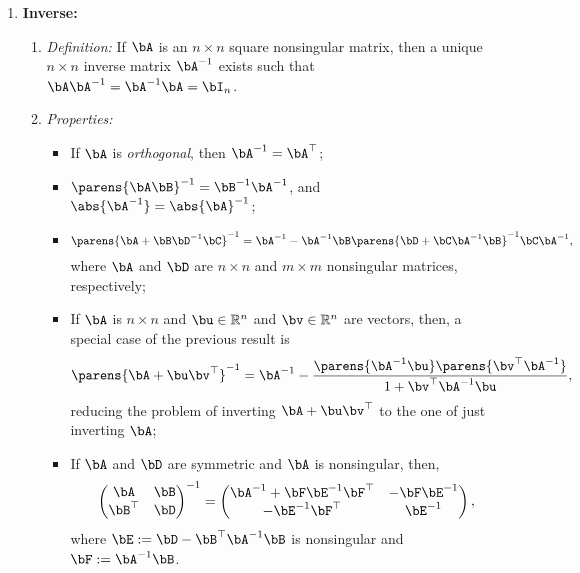 \documentclass[12pt]{article}
\begin{document}
\begin{enumerate}[label=\textbf{\arabic*.}]
	\item \textbf{Inverse:} 
	\begin{enumerate}
		\item \textit{Definition:} If $\bA$ is an $n \times n$ square nonsingular matrix, then a unique $n \times n$ inverse matrix $\bA^{-1}$ exists such that $\bA \bA^{-1} = \bA^{-1} \bA = \bI_n$. 
		\item \textit{Properties:} 
		\begin{itemize}
			\item If $\bA$ is \textit{orthogonal}, then $ \bA^{-1} = \bA^\top $; 
			\item $ \parens{\bA \bB}^{-1} = \bB^{-1} \bA^{-1} $, and $ \abs{\bA^{-1}} = \abs{\bA}^{-1}$; 
			\item $$\parens{\bA + \bB\bD^{-1}\bC}^{-1} = \bA^{-1} - \bA^{-1}\bB\parens{\bD + \bC\bA^{-1}\bB}^{-1}\bC\bA^{-1},$$ where $\bA$ and $\bD$ are $n \times n$ and $m \times m$ nonsingular matrices, respectively; 
			\item If $\bA$ is $n \times n$ and $\bu \in \mathbb{R}^n$ and $\bv \in \mathbb{R}^n$ are vectors, then, a special case of the previous result is 
			\begin{align*}
				\parens{\bA + \bu \bv^\top }^{-1} = \bA^{-1} - \frac{ \parens{\bA^{-1} \bu} \parens{\bv^\top \bA^{-1}} }{1 + \bv^\top \bA^{-1}\bu}, 
			\end{align*}
			reducing the problem of inverting $\bA + \bu \bv^\top$ to the one of just inverting $\bA$; 
			\item If $\bA$ and $\bD$ are symmetric and $\bA$ is nonsingular, then, 
			\begin{align*}
				\begin{pmatrix}
					\bA & \bB \\ \bB^\top & \bD
					\end{pmatrix}^{-1} = \begin{pmatrix}
					\bA^{-1} + \bF \bE^{-1}\bF^\top & - \bF \bE^{-1} \\ 
					- \bE^{-1}\bF^\top & \bE^{-1}
				\end{pmatrix}, 
			\end{align*}
			where $ \bE := \bD - \bB^\top \bA^{-1}\bB $ is nonsingular and $ \bF := \bA^{-1}\bB $. 
		\end{itemize}
	\end{enumerate}
	

\end{enumerate}
\end{document}
